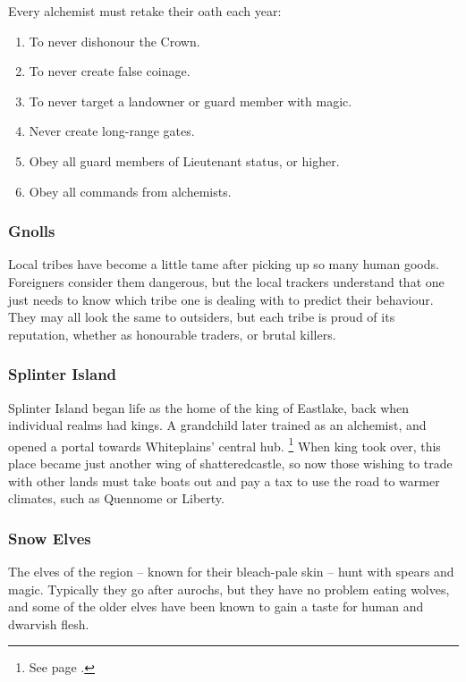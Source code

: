 \begin{multicols}{2}
Every alchemist must retake their oath each year:

\needspace{3em}
\begin{enumerate}

  \item
  To never dishonour the Crown.
  \item
  To never create false coinage.
  \item
  To never target a landowner or \gls{guard} member with magic.
  \item
  Never create long-range gates.
  \item
  Obey all \gls{guard} members of Lieutenant status, or higher.
  \item
  Obey all commands from \gls{alchemists}.

\end{enumerate}

\subsubsection{Gnolls}

Local tribes have become a little tame after picking up so many human goods.
Foreigners consider them dangerous, but the local trackers understand that one just needs to know which tribe one is dealing with to predict their behaviour.
They may all look the same to outsiders, but each tribe is proud of its reputation, whether as honourable traders, or brutal killers.

\subsubsection{Splinter Island}

Splinter Island began life as the home of the king of Eastlake, back when individual realms had kings.
A grandchild later trained as an alchemist, and opened a portal towards Whiteplains' central hub.%
\footnote{See page \pageref{whiteland_heart}.}
When \gls{king} took over, this place became just another wing of \gls{shatteredcastle}, so now those wishing to trade with other lands must take boats out and pay a tax to use the road to warmer climates, such as Quennome or Liberty.

\subsubsection{Snow Elves}

The elves of the region -- known for their bleach-pale skin -- hunt with spears and magic.
Typically they go after aurochs, but they have no problem eating wolves, and some of the older elves have been known to gain a taste for human and dwarvish flesh.


\end{multicols}
